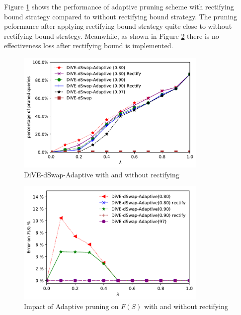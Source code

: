 \documentclass{article}
\begin{document}
Figure \ref{fig:rectifying_bound} shows the performance of adaptive pruning scheme with rectifying bound strategy compared to without rectifying bound strategy. The pruning peformance after applying rectifying bound strategy quite close to without rectifying bound strategy. Meanwhile, as shown in Figure \ref{fig:rectify_error_fs} there is no effectiveness loss after rectifying bound is implemented. 

\begin{figure}[t]
	\centering
	\includegraphics[width=3.6in]{figures/pruning_performance_dswap_adaptive_rectifying_compare}
	\vspace{-5pt}
	\caption{DiVE-dSwap-Adaptive with and without rectifying}
	\label{fig:rectifying_bound}
\end{figure}




\begin{figure}[t]
	\centering
	\includegraphics[width=3.6in]{figures/error_fs_rectifying_dswap}
	\vspace{-5pt}
	\caption{Impact of Adaptive pruning on $F(S)$ with and without rectifying}
	\label{fig:rectify_error_fs}
\end{figure}



\end{document}
